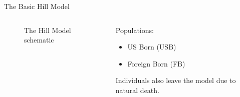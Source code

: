 \documentclass[final]{beamer}
\begin{document}
\begin{frame}
\begin{columns}[T]
\begin{column}{.3\textwidth}
\begin{block}{The Basic Hill Model}
\begin{columns}[T]
\begin{column}{.5\textwidth}
\begin{figure}[h]
\begin{center}
              \end{center}
              \caption{The Hill Model schematic}
              \label{fig:hillFlow}
            \end{figure}
          \end{column}
          \begin{column}{.45\textwidth}
              \vspace{1.5em}
            Populations:
            \begin{itemize}
              \item US Born (USB) 
              \item Foreign Born (FB)
            \end{itemize}
            Individuals also leave the model due to natural death.
          \end{column}
        \end{columns}


\end{block}
\end{column}
\end{columns}
\end{frame}
\end{document}
